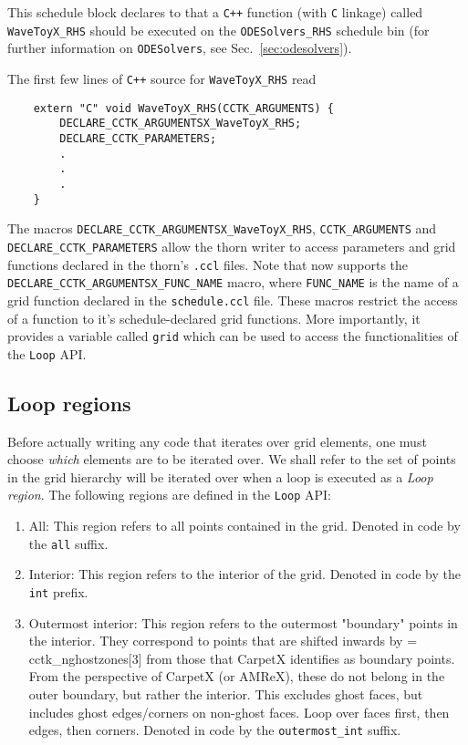 This schedule block declares to \Cactus\space that a \texttt{C++} function (with \texttt{C} linkage) called \texttt{WaveToyX\_RHS} should be executed on the \texttt{ODESolvers\_RHS} schedule bin (for further information on \texttt{ODESolvers}, see Sec.~\ref{sec:odesolvers}).

The first few lines of \texttt{C++} source for \texttt{WaveToyX\_RHS} read
%
\begin{lstlisting}
    extern "C" void WaveToyX_RHS(CCTK_ARGUMENTS) {
        DECLARE_CCTK_ARGUMENTSX_WaveToyX_RHS;
        DECLARE_CCTK_PARAMETERS;
        .
        .
        .
    }
\end{lstlisting}
%
The macros \texttt{DECLARE\_CCTK\_ARGUMENTSX\_WaveToyX\_RHS}, \texttt{CCTK\_ARGUMENTS} and \texttt{DECLARE\_CCTK\_PARAMETERS} allow the thorn writer to access parameters and grid functions declared in the thorn's \texttt{.ccl} files. Note that \Cactus\space now supports the \texttt{DECLARE\_CCTK\_ARGUMENTSX\_FUNC\_NAME} macro, where \texttt{FUNC\_NAME} is the name of a grid function declared in the \texttt{schedule.ccl} file. These macros restrict the access of a function to it's schedule-declared grid functions. More importantly, it provides a variable called \texttt{grid} which can be used to access the functionalities of the \texttt{Loop} API.

\subsection{Loop regions}
\label{sec:loop_regions}

Before actually writing any code that iterates over grid elements, one must choose \textit{which} elements are to be iterated over. We shall refer to the set of points in the grid hierarchy will be iterated over when a loop is executed as a \textit{Loop region}. The following regions are defined in the \texttt{Loop} API:

\begin{enumerate}
    \item All: This region refers to all points contained in the grid. Denoted in code by the \texttt{all} suffix.
    
    \item Interior: This region refers to the interior of the grid. Denoted in code by the \texttt{int} prefix.
    
    \item Outermost interior: This region refers to the outermost "boundary" points in the interior. They correspond to points that are shifted inwards by = cctk\_nghostzones[3] from those that CarpetX identifies as boundary points. From the perspective of CarpetX (or AMReX), these do not belong in the outer boundary, but rather the interior. This excludes ghost faces, but includes ghost edges/corners on non-ghost faces. Loop over faces first, then edges, then corners. Denoted in code by the \texttt{outermost\_int} suffix.
\end{enumerate}

